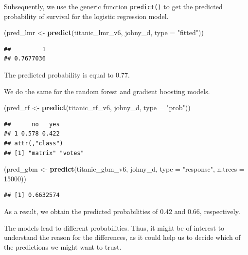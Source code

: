 \documentclass[12pt,]{krantz}
\newenvironment{Shaded}{\begin{snugshade}}{\end{snugshade}}
\newcommand{\DataTypeTok}[1]{\textcolor[rgb]{0.13,0.29,0.53}{#1}}
\newcommand{\DecValTok}[1]{\textcolor[rgb]{0.00,0.00,0.81}{#1}}
\newcommand{\KeywordTok}[1]{\textcolor[rgb]{0.13,0.29,0.53}{\textbf{#1}}}
\newcommand{\NormalTok}[1]{#1}
\newcommand{\StringTok}[1]{\textcolor[rgb]{0.31,0.60,0.02}{#1}}
\begin{document}
Subsequently, we use the generic function \texttt{predict()} to get the predicted probability of survival for the logistic regression model.

\begin{Shaded}
\begin{Highlighting}[]
\NormalTok{(pred_lmr <-}\StringTok{ }\KeywordTok{predict}\NormalTok{(titanic_lmr_v6, johny_d, }\DataTypeTok{type =} \StringTok{"fitted"}\NormalTok{))}
\end{Highlighting}
\end{Shaded}

\begin{verbatim}
##         1 
## 0.7677036
\end{verbatim}

The predicted probability is equal to 0.77.

We do the same for the random forest and gradient boosting models.

\begin{Shaded}
\begin{Highlighting}[]
\NormalTok{(pred_rf <-}\StringTok{ }\KeywordTok{predict}\NormalTok{(titanic_rf_v6, johny_d, }\DataTypeTok{type =} \StringTok{"prob"}\NormalTok{))}
\end{Highlighting}
\end{Shaded}

\begin{verbatim}
##      no   yes
## 1 0.578 0.422
## attr(,"class")
## [1] "matrix" "votes"
\end{verbatim}

\begin{Shaded}
\begin{Highlighting}[]
\NormalTok{(pred_gbm <-}\StringTok{ }\KeywordTok{predict}\NormalTok{(titanic_gbm_v6, johny_d, }\DataTypeTok{type =} \StringTok{"response"}\NormalTok{, }\DataTypeTok{n.trees =} \DecValTok{15000}\NormalTok{))}
\end{Highlighting}
\end{Shaded}

\begin{verbatim}
## [1] 0.6632574
\end{verbatim}

As a result, we obtain the predicted probabilities of 0.42 and 0.66, respectively.

The models lead to different probabilities. Thus, it might be of interest to understand the reason for the differences, as it could help us to decide which of the predictions we might want to trust.
\end{document}
